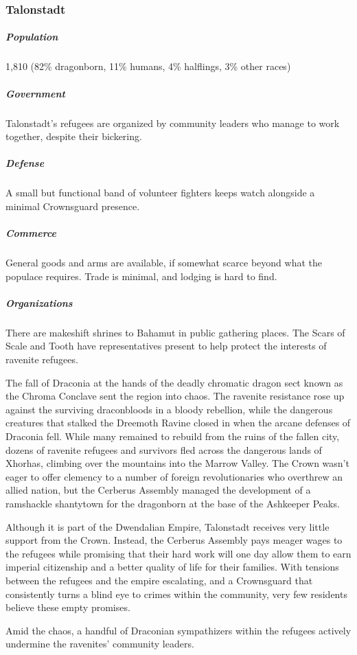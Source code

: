 \documentclass[10pt,a4paper,twoside,bg=print,twocolumn,openany,nodeprecatedcode]{dndbook}
\begin{document}
\subsubsection{Talonstadt}
\subparagraph{Population}
1,810 (82\% dragonborn, 11\% humans, 4\% halflings, 3\% other races)

\subparagraph{Government}
Talonstadt's refugees are organized by community leaders who manage to work together, despite their bickering.

\subparagraph{Defense}
A small but functional band of volunteer fighters keeps watch alongside a minimal Crownsguard presence.

\subparagraph{Commerce}
General goods and arms are available, if somewhat scarce beyond what the populace requires. Trade is minimal, and lodging is hard to find.

\subparagraph{Organizations}
There are makeshift shrines to Bahamut in public gathering places. The Scars of Scale and Tooth have representatives present to help protect the interests of ravenite refugees.

The fall of Draconia at the hands of the deadly chromatic dragon sect known as the Chroma Conclave sent the region into chaos. The ravenite resistance rose up against the surviving draconbloods in a bloody rebellion, while the dangerous creatures that stalked the Dreemoth Ravine closed in when the arcane defenses of Draconia fell. While many remained to rebuild from the ruins of the fallen city, dozens of ravenite refugees and survivors fled across the dangerous lands of Xhorhas, climbing over the mountains into the Marrow Valley. The Crown wasn't eager to offer clemency to a number of foreign revolutionaries who overthrew an allied nation, but the Cerberus Assembly managed the development of a ramshackle shantytown for the dragonborn at the base of the Ashkeeper Peaks.

Although it is part of the Dwendalian Empire, Talonstadt receives very little support from the Crown. Instead, the Cerberus Assembly pays meager wages to the refugees while promising that their hard work will one day allow them to earn imperial citizenship and a better quality of life for their families. With tensions between the refugees and the empire escalating, and a Crownsguard that consistently turns a blind eye to crimes within the community, very few residents believe these empty promises.

Amid the chaos, a handful of Draconian sympathizers within the refugees actively undermine the ravenites' community leaders.
\end{document}
